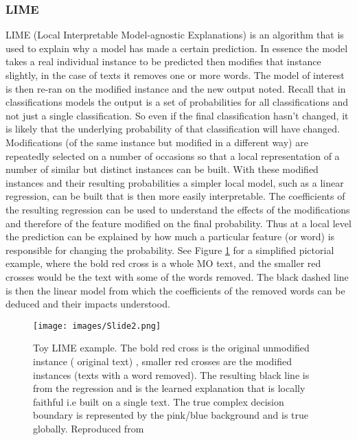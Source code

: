 \subsubsection{LIME} LIME (Local Interpretable Model-agnostic Explanations) \parencite{ribeiro2016should} is an algorithm that is used to explain why a model has made a certain prediction. In essence the model takes a real individual instance to be predicted then modifies that instance slightly, in the case of texts it removes one or more words. The model of interest is then re-ran on the modified instance and the new output noted. Recall that in classifications models the output is a set of probabilities for all classifications and not just a single classification. So even if the final classification hasn't changed, it is likely that the underlying probability of that classification will have changed. Modifications (of the same instance but modified in a different way) are repeatedly selected on a number of occasions so that a local representation of a number of similar but distinct instances can be built. With these modified instances and their resulting probabilities a simpler local model, such as a linear regression, can be built that is then more easily interpretable. The coefficients of the resulting regression can be used to understand the effects of the modifications and therefore of the feature modified on the final probability. Thus at a local level the prediction can be explained by how much a particular feature (or word) is responsible for changing the probability. See Figure \ref{fig:LIME} for a simplified pictorial example, where the bold red cross is a whole MO text, and the smaller red crosses would be the text with some of the words removed. The black dashed line is then the linear model from which the coefficients of the removed words can be deduced and their impacts understood.
\begin{figure}[!tbp]
  \centering
    \texttt{[image: images/Slide2.png]}
    \caption{{Toy LIME example.} The bold red cross is the original unmodified instance ( original text) , smaller red crosses are the modified instances (texts with a word removed). The resulting black line is from the regression and is the learned explanation that is locally faithful i.e built on a single text. The true complex decision boundary is represented by the pink/blue background and is true globally. Reproduced from \parencite{ribeiro2016should} }
    \label{fig:LIME}
\end{figure}


